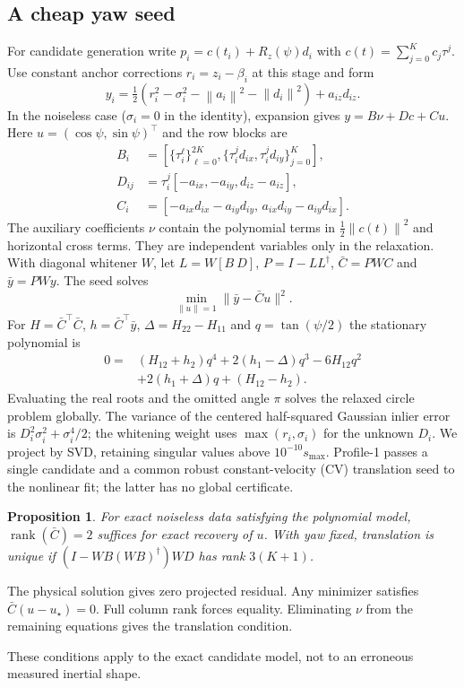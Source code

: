 \documentclass[conference,letterpaper,10pt]{IEEEtran}
\newcommand{\rz}{R_z}
\newcommand{\norm}[1]{\left\lVert#1\right\rVert}
\newtheorem{proposition}{Proposition}
\begin{document}
\subsection{A cheap yaw seed}
For candidate generation write $p_i=c(t_i)+\rz(\psi)d_i$ with $c(t)=\sum_{j=0}^K c_j\tau^j$. Use constant anchor corrections $r_i=z_i-\beta_i$ at this stage and form
\begin{equation}
 y_i=\tfrac12(r_i^2-\sigma_i^2-\norm{a_i}^2-\norm{d_i}^2)+a_{iz}d_{iz}.
\end{equation}
In the noiseless case ($\sigma_i=0$ in the identity), expansion gives $y=B\nu+Dc+Cu$. Here $u=(\cos\psi,\sin\psi)^\top$ and the row blocks are
\begin{align}
 B_i&=[\{\tau_i^\ell\}_{\ell=0}^{2K},\{\tau_i^j d_{ix},\tau_i^j d_{iy}\}_{j=0}^{K}],\nonumber\\
 D_{ij}&=\tau_i^j[-a_{ix},-a_{iy},d_{iz}-a_{iz}],\nonumber\\
 C_i&=[-a_{ix}d_{ix}-a_{iy}d_{iy},\,a_{ix}d_{iy}-a_{iy}d_{ix}].
\end{align}
The auxiliary coefficients $\nu$ contain the polynomial terms in $\frac12\norm{c(t)}^2$ and horizontal cross terms. They are independent variables only in the relaxation. With diagonal whitener $W$, let $L=W[B\ D]$, $P=I-LL^\dagger$, $\bar C=PWC$ and $\bar y=PWy$. The seed solves
\begin{equation}
  \min_{\|u\|=1}\|\bar y-\bar C u\|^2 .               \label{eq:circle}
\end{equation}
For $H=\bar C^\top\bar C$, $h=\bar C^\top\bar y$, $\Delta=H_{22}-H_{11}$ and $q=\tan(\psi/2)$ the stationary polynomial is
\begin{align}
 0={}&(H_{12}+h_2)q^4+2(h_1-\Delta)q^3-6H_{12}q^2 \nonumber\\
    &+2(h_1+\Delta)q+(H_{12}-h_2).
\end{align}
Evaluating the real roots and the omitted angle $\pi$ solves the relaxed circle problem globally. The variance of the centered half-squared Gaussian inlier error is $D_i^2\sigma_i^2+\sigma_i^4/2$; the whitening weight uses $\max(r_i,\sigma_i)$ for the unknown $D_i$. We project by SVD, retaining singular values above $10^{-10}s_{\max}$. Profile-1 passes a single candidate and a common robust constant-velocity (CV) translation seed to the nonlinear fit; the latter has no global certificate.

\begin{proposition}
For exact noiseless data satisfying the polynomial model, $\operatorname{rank}(\bar C)=2$ suffices for exact recovery of $u$. With yaw fixed, translation is unique if $(I-WB(WB)^\dagger)WD$ has rank $3(K+1)$.
\end{proposition}
\begin{IEEEproof}
The physical solution gives zero projected residual. Any minimizer satisfies $\bar C(u-u_\star)=0$. Full column rank forces equality. Eliminating $\nu$ from the remaining equations gives the translation condition.
\end{IEEEproof}
These conditions apply to the exact candidate model, not to an erroneous measured inertial shape.
\end{document}
